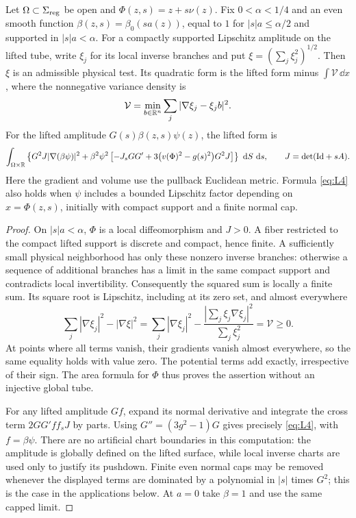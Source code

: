 \begin{lemma}\label{lem:interface-immersed-test}
Let $\Omega\subset\Sigma_{\rm reg}$ be open and
$\Phi(z,s)=z+s\nu(z)$.  Fix $0<\alpha<1/4$ and an even smooth
function $\beta(z,s)=\beta_0(sa(z))$, equal to $1$ for
$|s|a\le\alpha/2$ and supported in $|s|a<\alpha$.
For a compactly supported Lipschitz amplitude on the lifted tube,
write $\xi_j$ for its local inverse branches and put
$\xi=(\sum_j\xi_j^2)^{1/2}$.  Then $\xi$ is an admissible physical
test.  Its quadratic form is the lifted form minus
$\int\mathcal V\,\dd x$, where the nonnegative variance density is
\[
 \mathcal V=\min_{b\in\mathbb R^n}\sum_j|\nabla\xi_j-\xi_j b|^2.
\]
For the lifted amplitude $G(s)\beta(z,s)\psi(z)$, the lifted form is
\begin{equation}\label{eq:L4}
 \int_{\Omega\times\mathbb R}\left\{
 G^2J|\nabla(\beta\psi)|^2+
 \beta^2\psi^2\left[-J_sGG'
       +3\bigl(v(\Phi)^2-g(s)^2\bigr)G^2J\right]\right\}
       \,\,\mathrm d S\,\,\mathrm d s,
 \qquad J=\det(\mathrm{Id}+sA).
\end{equation}
Here the gradient and volume use the pullback Euclidean metric.
Formula \eqref{eq:L4} also holds when $\psi$ includes a bounded
Lipschitz factor depending on $x=\Phi(z,s)$, initially with compact
support and a finite normal cap.
\end{lemma}

\begin{proof}
On $|s|a<\alpha$, $\Phi$ is a local diffeomorphism and $J>0$.
A fiber restricted to the compact lifted support is discrete and
compact, hence finite.  A sufficiently small physical neighborhood
has only these nonzero inverse branches: otherwise a sequence of
additional branches has a limit in the same compact support and
contradicts local invertibility.  Consequently the squared sum is
locally a finite sum.  Its square root is Lipschitz, including at
its zero set, and almost everywhere
\[
 \sum_j|\nabla\xi_j|^2-|\nabla\xi|^2
 =\sum_j|\nabla\xi_j|^2-
   \frac{|\sum_j\xi_j\nabla\xi_j|^2}{\sum_j\xi_j^2}
 =\mathcal V\ge0.
\]
At points where all terms vanish, their gradients vanish almost
everywhere, so the same equality holds with value zero.  The potential
terms add exactly, irrespective of their sign.  The area formula for
$\Phi$ thus proves the assertion without an injective global tube.

For any lifted amplitude $G f$, expand its normal derivative and
integrate the cross term $2GG'ff_sJ$ by parts.  Using
$G''=(3g^2-1)G$ gives precisely \eqref{eq:L4}, with $f=\beta\psi$.
There are no artificial chart boundaries in this computation: the
amplitude is globally defined on the lifted surface, while local
inverse charts are used only to justify its pushdown.  Finite even
normal caps may be removed whenever the displayed terms are dominated
by a polynomial in $|s|$ times $G^2$; this is the case in the applications
below.  At $a=0$ take $\beta=1$ and use the same capped limit.
\end{proof}

